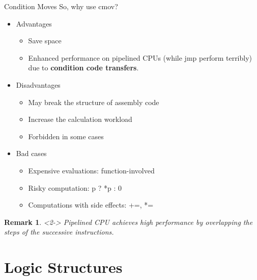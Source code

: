 \documentclass{beamer}
\newtheorem{rmk}{Remark}
\begin{document}
        \begin{frame}{Condition Moves}
            So, why use cmov?
            \begin{itemize}
                \item<2-> Advantages\\
                    \begin{itemize}
                        \item Save space
                        \item Enhanced performance on pipelined CPUs (while jmp perform terribly) due to \textbf{condition code transfers}.
                    \end{itemize}
                \item<3-> Disadvantages\\
                    \begin{itemize}
                        \item May break the structure of assembly code
                        \item Increase the calculation workload
                        \item Forbidden in some cases
                    \end{itemize}
                \item<4-> Bad cases\\
                    \begin{itemize}
                        \item Expensive evaluations: function-involved
                        \item Risky computation: p ? *p : 0
                        \item Computations with side effects: +=, *=
                    \end{itemize}
            \end{itemize}
            \begin{rmk}<2->
                Pipelined CPU achieves high performance by overlapping the steps of the successive instructions.
            \end{rmk}
        \end{frame}

    \section{Logic Structures}
\end{document}
